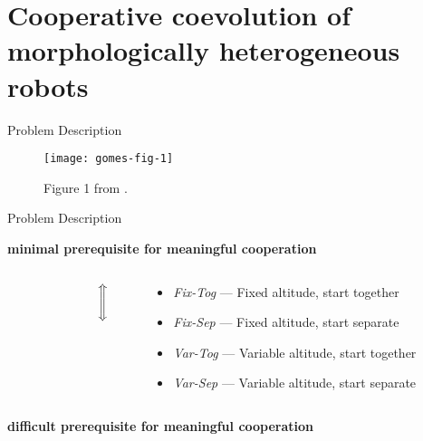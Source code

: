 \section{Cooperative coevolution of morphologically heterogeneous robots \cite{gomes2015cooperative}}

\begin{frame}{Problem Description}

\begin{figure}

\texttt{[image: gomes-fig-1]}

\caption{
Figure 1 from \cite{gomes2015cooperative}.
}

\end{figure}

\end{frame}

\begin{frame}{Problem Description}

{\Large
\textbf{minimal prerequisite for meaningful cooperation}
}

\vspace{1ex}

\begin{columns}
\begin{column}{0.02\textwidth}
\end{column}
\begin{column}{0.02\textwidth}
\Huge
\[
\bm{\Bigg\Updownarrow}
\]
\end{column}
\begin{column}{0.96\textwidth}
\begin{itemize}
\item[] \textit{Fix-Tog} --- Fixed altitude, start together
\item[] \textit{Fix-Sep} --- Fixed altitude, start separate
\item[] \textit{Var-Tog} --- Variable altitude, start together
\item[] \textit{Var-Sep} --- Variable altitude, start separate
\end{itemize}
\end{column}
\end{columns}

\vspace{1ex}

{\Large
\textbf{difficult prerequisite for meaningful cooperation}
}

\end{frame}

